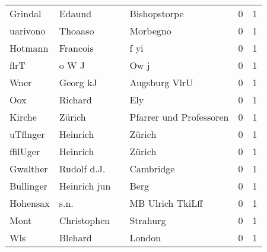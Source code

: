 \begin{tabular}{llllrr}
                  Grindal &                             Edaund &             &                                Bishopstorpe &          0 &         1 \\
                 uarivono &                            Thoaaso &             &                                    Morbegno &          0 &         1 \\
                  Hotmann &                           Francois &             &                                        f yi &          0 &         1 \\
                     flrT &                              o W J &             &                                        Ow j &          0 &         1 \\
                     Wner &                           Georg kJ &             &                               Augsburg VlrU &          0 &         1 \\
                      Oox &                            Richard &             &                                         Ely &          0 &         1 \\
                   Kirche &                             Zürich &             &                     Pfarrer und Professoren &          0 &         1 \\
                 uTflnger &                           Heinrich &             &                                      Zürich &          0 &         1 \\
                 ffilUger &                           Heinrich &             &                                      Zürich &          0 &         1 \\
                 Gwalther &                        Rudolf d.J. &             &                                   Cambridge &          0 &         1 \\
                Bullinger &                       Heinrich jun &             &                                        Berg &          0 &         1 \\
                 Hohensax &                               s.n. &             &                            MB Ulrich TkiLff &          0 &         1 \\
                     Mont &                        Christophen &             &                                    Strahurg &          0 &         1 \\
                      Wls &                            Blehard &             &                                      London &          0 &         1 \\

\end{tabular}
